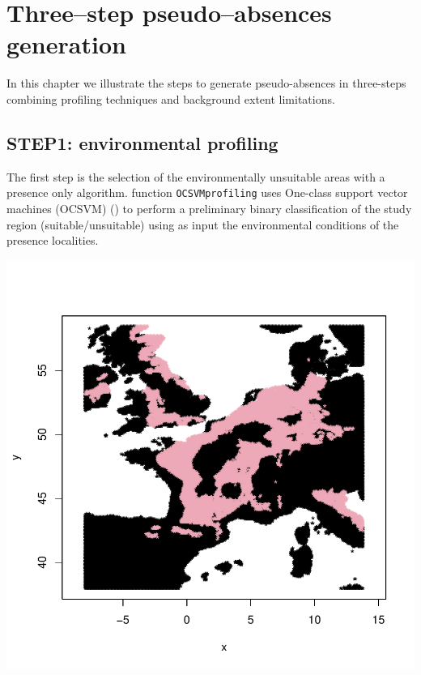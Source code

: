 \documentclass[10pt,a4paper]{report}
\begin{document}
\chapter{Three--step pseudo--absences generation}

In this chapter we illustrate the steps to generate pseudo-absences in three-steps combining profiling techniques and background extent limitations. 

\section{STEP1: environmental profiling}

The first step is the selection of the environmentally unsuitable areas with a presence only algorithm. function \texttt{OCSVMprofiling} uses One-class support vector machines (OCSVM) (\citet{scholkopf_learning_2001}) to perform a preliminary binary classification of the study region (suitable/unsuitable) using as input the environmental conditions of the presence localities.

\begin{Schunk}
\end{Schunk}
\includegraphics{mopa-mopa7}
\end{document}
